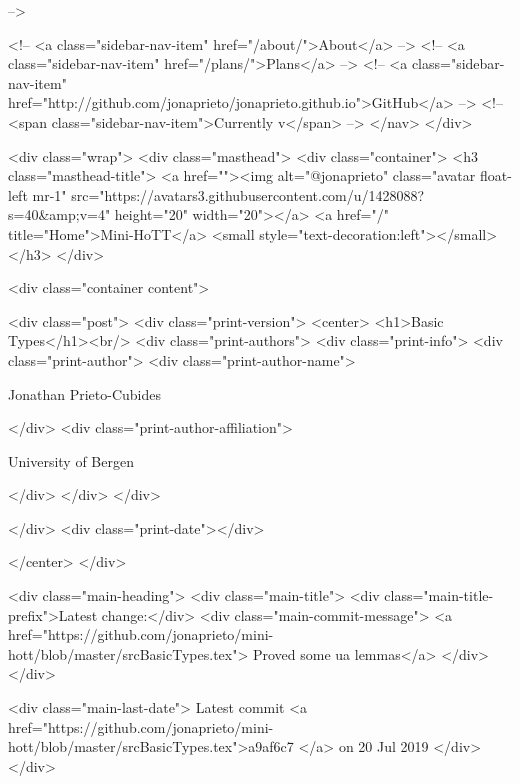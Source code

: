       
     -->

    <!-- <a class="sidebar-nav-item" href="/about/">About</a> -->
    <!-- <a class="sidebar-nav-item" href="/plans/">Plans</a> -->
    <!-- <a class="sidebar-nav-item" href="http://github.com/jonaprieto/jonaprieto.github.io">GitHub</a> -->
    <!-- <span class="sidebar-nav-item">Currently v</span> -->
  </nav>
</div>

    <div class="wrap">
      <div class="masthead">
        <div class="container">
          <h3 class="masthead-title">
            <a href=""><img alt="@jonaprieto" class="avatar float-left mr-1" src="https://avatars3.githubusercontent.com/u/1428088?s=40&amp;v=4" height="20" width="20"></a>
            <a href="/" title="Home">Mini-HoTT</a>
            <small style="text-decoration:left"></small>
          </h3>
        </div>
      
      <div class="container content">
        







<div class="post">
  <div class="print-version">
    <center>
      <h1>Basic Types</h1><br/>
        <div class="print-authors">
          <div class="print-info">
            <div class="print-author">
              <div class="print-author-name">
                
                  Jonathan Prieto-Cubides
                
              </div>
              <div class="print-author-affiliation">
                
                  University of Bergen
                
                </div>
            </div>
          </div>
          
          
        </div>
        <div class="print-date"></div>
        
        
    </center>
  </div>

  
  <div class="main-heading">
    <div class="main-title">
      <div class="main-title-prefix">Latest change:</div>
      <div class="main-commit-message">
            <a href="https://github.com/jonaprieto/mini-hott/blob/master/srcBasicTypes.tex">
              Proved some ua lemmas</a>
      </div>
    </div>

    <div class="main-last-date">
      Latest commit <a href="https://github.com/jonaprieto/mini-hott/blob/master/srcBasicTypes.tex">a9af6c7 </a> on  20 Jul 2019
    </div>
  </div>
  

